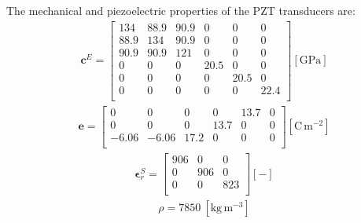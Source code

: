 \documentclass[sensors,article,accept,moreauthors,pdftex]{Definitions/mdpi}
\begin{document}
\begin{paracol}{2}
\switchcolumn


The mechanical and piezoelectric properties of the PZT transducers are:
\begin{eqnarray}
\textbf{c}^E=\left [ 
\begin{array}{cccccc}
134 & 88.9 & 90.9 & 0 & 0 & 0 \\ 
88.9 & 134 & 90.9 & 0 & 0 & 0 \\
90.9 & 90.9 & 121 & 0 & 0 & 0 \\
0 & 0 & 0 & 20.5 & 0 & 0 \\
0 & 0 & 0 & 0 & 20.5 & 0 \\
0 & 0 & 0 & 0 & 0 & 22.4 \nonumber \\
\end{array}
\right ] \left [ \mathrm{GPa} \right ]
\end{eqnarray}
\begin{eqnarray}
\textbf{e}=\left[
\begin{array}{cccccc}
0 & 0 & 0 & 0 & 13.7 & 0\\
0 & 0 & 0 & 13.7 & 0 & 0\\
-6.06 & -6.06 & 17.2 & 0 & 0 & 0\nonumber \\
\end{array}
\right] \left[\mathrm{C}\,\mathrm{m}^{-2}\right]
\end{eqnarray}
\begin{eqnarray}
\boldsymbol{\epsilon}^S_r=\left[
\begin{array}{ccc}
906 & 0 & 0\\
0 & 906 & 0\\
0 & 0 & 823\nonumber \\
\end{array}
\right] \left[ - \right]
\end{eqnarray}
\begin{eqnarray}
\rho=7850\ [\mathrm{kg}\,\mathrm{m}^{-3}] \nonumber
\end{eqnarray}
\end{paracol}


\end{document}

